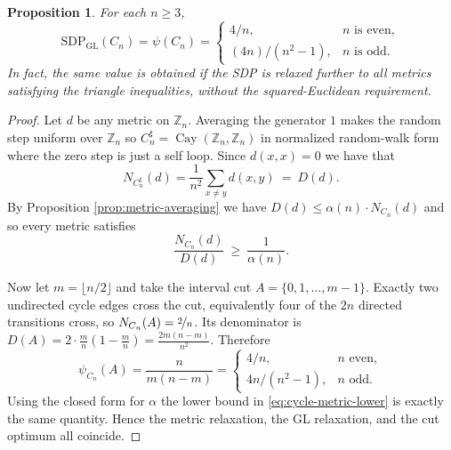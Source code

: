 \documentclass[10pt,a4paper]{amsart}
\newtheorem{proposition}{Proposition}
\newcommand{\Cay}{\operatorname{Cay}}
\newcommand{\Z}{\mathbb{Z}}
\newcommand{\gl}{\operatorname{SDP_{GL}}}
\begin{document}
\begin{proposition}
\label{prop:cycle-exact}
For each $n\geq 3$,
\begin{equation}\label{eq:cycle-exact}
  \gl(C_n)=\psi(C_n)
  =
  \begin{cases}
    4/n,& n \text{ is even},\\[6pt]
    (4n)/(n^2-1),&n\text{ is odd}.
  \end{cases}
\end{equation}
In fact, the same value is obtained if the SDP is relaxed further to all metrics satisfying the triangle inequalities, without the squared-Euclidean requirement.
\end{proposition}

\begin{proof}
Let $d$ be any metric on $\Z_n$. Averaging the generator $1$ makes the random step uniform over $\Z_n$ so $C_n^\sharp=\Cay(\Z_n,\Z_n)$ in normalized random-walk form where the zero step is just a self loop. Since $d(x,x)=0$ we have that
\[
  N_{C_n^\sharp}(d)
  =\frac1{n^2}\sum_{x \neq y}d(x,y) ~=~ D(d).
\]
By Proposition \ref{prop:metric-averaging} we have $D(d) \leq \alpha(n) \cdot N_{C_n}(d)$ and so every metric satisfies
\begin{equation}\label{eq:cycle-metric-lower}
  \frac{N_{C_n}(d)}{D(d)}
  ~\geq~\frac{1}{\alpha(n)}.
\end{equation}

Now let $m=\lfloor n/2\rfloor$ and take the interval cut $A=\{0,1,\ldots,m-1\}$. Exactly two undirected cycle edges cross the cut, equivalently four of the $2n$ directed transitions cross, so $N_{C_n}(A)=\nicefrac{2}{n}$. Its denominator is $D(A) = 2 \cdot \frac{m}{n} \left(1-\frac{m}{n}\right) = \frac{2m(n-m)}{n^2}$.
Therefore
\[
  \psi_{C_n}(A)=\frac{n}{m(n-m)}
  =
  \begin{cases}
    4/n,&n\text{ even},\\[3pt]
    4n/(n^2-1),&n\text{ odd}.
  \end{cases}
\]
Using the closed form for $\alpha$ the lower bound in \eqref{eq:cycle-metric-lower} is exactly the same quantity. Hence the metric relaxation, the GL relaxation, and the cut optimum all coincide.
\end{proof}
\end{document}
